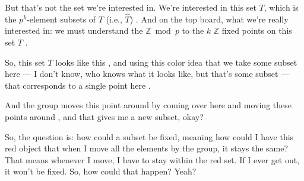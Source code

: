 \begin{proofWrapper}
\begin{content}
\begin{center}
\end{center}
\end{content}

\begin{hidden}
\end{hidden}

\begin{speech}[01:03:08 - 01:04:30]
But that's not the set we're interested in. We're interested in this set $T$, which is the $p^k$-element subsets of $T$ (i.e., $\widehat{T}$) . And on the top board, what we're really interested in: we must understand the $\mathbb{Z} \bmod p$ to the $k$ $\mathbb{Z}$ fixed points on this set $T$ .

So, this set $T$ looks like this , and using this color idea that we take some subset here --- I don't know, who knows what it looks like, but that's some subset  --- that corresponds to a single point here .

And the group moves this point around by coming over here  and moving these points around , and that gives me a new subset, okay?

So, the question is: how could a subset be fixed, meaning how could I have this red object that when I move all the elements by the group, it stays the same? That means whenever I move, I have to stay within the red set. If I ever get out, it won't be fixed. So, how could that happen? Yeah?
\end{speech}


\end{proofWrapper}
